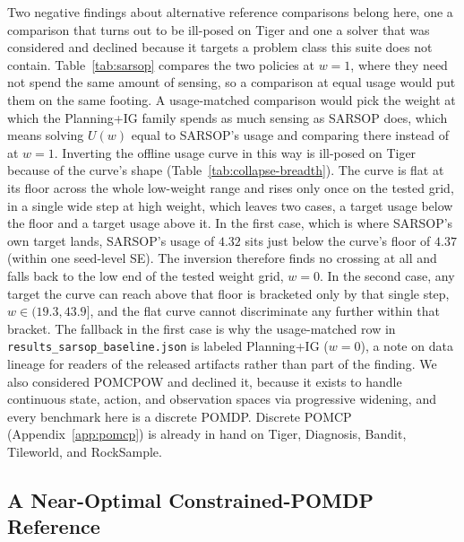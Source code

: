 Two negative findings about alternative reference comparisons belong here, one a comparison that turns out to be ill-posed on Tiger and one a solver that was considered and declined because it targets a problem class this suite does not contain. Table~\ref{tab:sarsop} compares the two policies at $w{=}1$, where they need not spend the same amount of sensing, so a comparison at equal usage would put them on the same footing. A usage-matched comparison would pick the weight at which the Planning+IG family spends as much sensing as SARSOP does, which means solving $U(w)$ equal to SARSOP's usage and comparing there instead of at $w{=}1$. Inverting the offline usage curve in this way is ill-posed on Tiger because of the curve's shape (Table~\ref{tab:collapse-breadth}). The curve is flat at its floor across the whole low-weight range and rises only once on the tested grid, in a single wide step at high weight, which leaves two cases, a target usage below the floor and a target usage above it. In the first case, which is where SARSOP's own target lands, SARSOP's usage of $4.32$ sits just below the curve's floor of $4.37$ (within one seed-level SE). The inversion therefore finds no crossing at all and falls back to the low end of the tested weight grid, $w{=}0$. In the second case, any target the curve can reach above that floor is bracketed only by that single step, $w \in (19.3, 43.9]$, and the flat curve cannot discriminate any further within that bracket. The fallback in the first case is why the usage-matched row in \texttt{results\_\allowbreak sarsop\_\allowbreak baseline.json} is labeled Planning+IG ($w{=}0$), a note on data lineage for readers of the released artifacts rather than part of the finding. We also considered POMCPOW \citep{sunberg2018} and declined it, because it exists to handle continuous state, action, and observation spaces via progressive widening, and every benchmark here is a discrete POMDP. Discrete POMCP (Appendix~\ref{app:pomcp}) is already in hand on Tiger, Diagnosis, Bandit, Tileworld, and RockSample.

\subsection{A Near-Optimal Constrained-POMDP Reference}
\label{sec:cpomdp}


